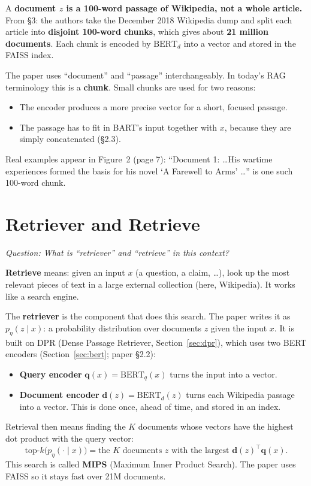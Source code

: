 \documentclass[11pt]{article}
\newcommand{\topk}{\text{top-}k}
\newcommand{\question}[1]{\noindent\textit{Question: #1}\par\medskip}
\begin{document}
A \textbf{document $z$ is a 100-word passage of Wikipedia, not a whole article.} From \S3: the authors take the December 2018 Wikipedia dump and split each article into \textbf{disjoint 100-word chunks}, which gives about \textbf{21 million documents}. Each chunk is encoded by $\mathrm{BERT}_d$ into a vector and stored in the FAISS index.

The paper uses ``document'' and ``passage'' interchangeably. In today's RAG terminology this is a \textbf{chunk}. Small chunks are used for two reasons:
\begin{itemize}[nosep]
  \item The encoder produces a more precise vector for a short, focused passage.
  \item The passage has to fit in BART's input together with $x$, because they are simply concatenated (\S2.3).
\end{itemize}

Real examples appear in Figure~2 (page 7): ``Document 1: \dots His wartime experiences formed the basis for his novel `A Farewell to Arms' \dots'' is one such 100-word chunk.

\section{Retriever and Retrieve}
\question{What is ``retriever'' and ``retrieve'' in this context?}

\textbf{Retrieve} means: given an input $x$ (a question, a claim, \dots), look up the most relevant pieces of text in a large external collection (here, Wikipedia). It works like a search engine.

The \textbf{retriever} is the component that does this search. The paper writes it as $p_\eta(z \mid x)$: a probability distribution over documents $z$ given the input $x$. It is built on DPR (Dense Passage Retriever, Section~\ref{sec:dpr}), which uses two BERT encoders (Section~\ref{sec:bert}; paper \S2.2):
\begin{itemize}[nosep]
  \item \textbf{Query encoder} $\mathbf{q}(x) = \mathrm{BERT}_q(x)$ turns the input into a vector.
  \item \textbf{Document encoder} $\mathbf{d}(z) = \mathrm{BERT}_d(z)$ turns each Wikipedia passage into a vector. This is done once, ahead of time, and stored in an index.
\end{itemize}
Retrieval then means finding the $K$ documents whose vectors have the highest dot product with the query vector:
\begin{equation}
  \topk\big(p_\eta(\cdot \mid x)\big) = \text{the $K$ documents $z$ with the largest } \mathbf{d}(z)^{\top}\mathbf{q}(x).
\end{equation}
This search is called \textbf{MIPS} (Maximum Inner Product Search). The paper uses FAISS so it stays fast over 21M documents.
\end{document}
